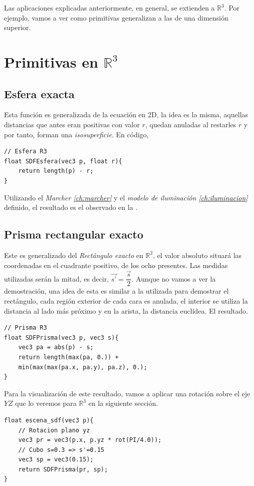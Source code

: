 Las aplicaciones explicadas anteriormente, en general, se extienden a \(\mathbb{R}^3\). Por ejemplo, vamos a ver como primitivas generalizan a las de una dimensión superior.

\section{Primitivas en \(\mathbb{R}^3\)}

\subsection{Esfera exacta}
Esta función es generalizada de la ecuación en 2D, la idea es la misma, aquellas distancias que antes eran positivas con valor \(r\), quedan anuladas al restarles \(r\) y por tanto, forman una \textit{isosuperficie}. En código,
\begin{lstlisting}
// Esfera R3
float SDFEsfera(vec3 p, float r){
    return length(p) - r;
}
\end{lstlisting}
Utilizando el \textit{Marcher \ref{ch:marcher}} y el \textit{modelo de iluminación \ref{ch:iluminacion}} definido, el resultado es el observado en la .

\subsection{Prisma rectangular exacto}
Este es generalizado del \textit{Rectángulo exacto} en \(\mathbb{R}^2\), el valor absoluto situará las coordenadas en el cuadrante positivo, de los ocho presentes. Las medidas utilizadas serán la mitad, es decir, \(\Vec{s’}= \dfrac{\Vec{s}}{2}\). Aunque no vamos a ver la demostración, una idea de esta es similar a la utilizada para demostrar el rectángulo, cada región exterior de cada cara es anulada, el interior se utiliza la distancia al lado más próximo y en la arista, la distancia euclídea. El resultado.

\begin{lstlisting}
// Prisma R3
float SDFPrisma(vec3 p, vec3 s){
    vec3 pa = abs(p) - s;
    return length(max(pa, 0.)) +
    min(max(max(pa.x, pa.y), pa.z), 0.);
}
\end{lstlisting}

Para la visualización de este resultado, vamos a aplicar una rotación sobre el eje \(YZ\) que lo veremos para \(\mathbb{R}^3\) en la siguiente sección.

\begin{lstlisting}
float escena_sdf(vec3 p){
    // Rotacion plano yz
    vec3 pr = vec3(p.x, p.yz * rot(PI/4.0));
    // Cubo s=0.3 => s'=0.15
    vec3 sp = vec3(0.15);
    return SDFPrisma(pr, sp);
}
\end{lstlisting}

